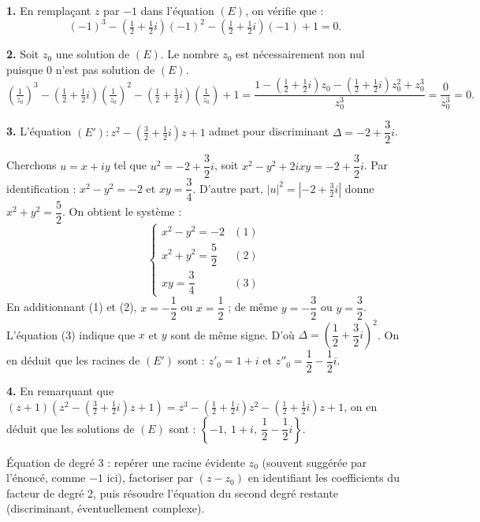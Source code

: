 \documentclass[11pt]{article}
\begin{document}


\textbf{1.} En remplaçant $z$ par $-1$ dans l'équation $(E)$, on vérifie que :
\[ (-1)^3 - \left(\tfrac{1}{2} + \tfrac{1}{2}i\right)(-1)^2 - \left(\tfrac{1}{2} + \tfrac{1}{2}i\right)(-1) + 1 = 0. \]

\textbf{2.} Soit $z_0$ une solution de $(E)$. Le nombre $z_0$ est nécessairement non nul puisque 0 n'est pas solution de $(E)$.
\[ \left(\tfrac{1}{z_0}\right)^3 - \left(\tfrac{1}{2} + \tfrac{1}{2}i\right)\left(\tfrac{1}{z_0}\right)^2 - \left(\tfrac{1}{2} + \tfrac{1}{2}i\right)\left(\tfrac{1}{z_0}\right) + 1 = \frac{1 - \left(\tfrac{1}{2} + \tfrac{1}{2}i\right)z_0 - \left(\tfrac{1}{2} + \tfrac{1}{2}i\right)z_0^2 + z_0^3}{z_0^3} = \frac{0}{z_0^3} = 0. \]

\textbf{3.} L'équation $(E') : z^2 - \left(\tfrac{3}{2} + \tfrac{1}{2}i\right)z + 1$ admet pour discriminant $\Delta = -2 + \dfrac{3}{2}i$.

Cherchons $u = x + iy$ tel que $u^2 = -2 + \dfrac{3}{2}i$, soit $x^2 - y^2 + 2ixy = -2 + \dfrac{3}{2}i$. Par identification : $x^2 - y^2 = -2$ et $xy = \dfrac{3}{4}$. D'autre part, $|u|^2 = \left|-2 + \tfrac{3}{2}i\right|$ donne $x^2 + y^2 = \dfrac{5}{2}$. On obtient le système :
\[ \begin{cases} x^2 - y^2 = -2 & (1) \\ x^2 + y^2 = \dfrac{5}{2} & (2) \\ xy = \dfrac{3}{4} & (3) \end{cases} \]
En additionnant (1) et (2), $x = -\dfrac{1}{2}$ ou $x = \dfrac{1}{2}$ ; de même $y = -\dfrac{3}{2}$ ou $y = \dfrac{3}{2}$. L'équation (3) indique que $x$ et $y$ sont de même signe. D'où $\Delta = \left(\dfrac{1}{2} + \dfrac{3}{2}i\right)^2$. On en déduit que les racines de $(E')$ sont : $z'_0 = 1 + i$ et $z''_0 = \dfrac{1}{2} - \dfrac{1}{2}i$.

\textbf{4.} En remarquant que $(z + 1)\left(z^2 - \left(\tfrac{3}{2} + \tfrac{1}{2}i\right)z + 1\right) = z^3 - \left(\tfrac{1}{2} + \tfrac{1}{2}i\right)z^2 - \left(\tfrac{1}{2} + \tfrac{1}{2}i\right)z + 1$, on en déduit que les solutions de $(E)$ sont : $\left\{-1,\ 1 + i,\ \dfrac{1}{2} - \dfrac{1}{2}i\right\}$.

\begin{methode}
Équation de degré 3 : repérer une racine évidente $z_0$ (souvent
suggérée par l'énoncé, comme $-1$ ici), factoriser par $(z - z_0)$ en
identifiant les coefficients du facteur de degré 2, puis résoudre
l'équation du second degré restante (discriminant, éventuellement
complexe).
\end{methode}
\end{document}
